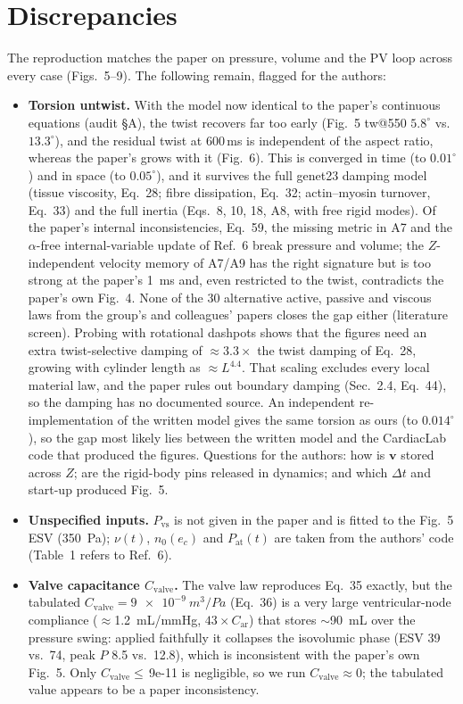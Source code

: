 \documentclass[10pt]{article}
\begin{document}
\section*{Discrepancies}
The reproduction matches the paper on pressure, volume and the PV loop across every case
(Figs.~5--9). The following remain, flagged for the authors:
\begin{itemize}
  \item \textbf{Torsion untwist.} With the model now identical to the paper's continuous
  equations (audit \S A), the twist recovers far too early (Fig.~5 tw@550 $5.8^\circ$ vs.\
  $13.3^\circ$), and the residual twist at 600\,ms is independent of the aspect ratio, whereas
  the paper's grows with it (Fig.~6). This is converged in time (to $0.01^\circ$) and in space
  (to $0.05^\circ$), and it survives the full genet23 damping model (tissue viscosity, Eq.~28;
  fibre dissipation, Eq.~32; actin--myosin turnover, Eq.~33) and the full inertia (Eqs.~8, 10,
  18, A8, with free rigid modes). Of the paper's internal inconsistencies, Eq.~59, the missing
  metric in A7 and the $\alpha$-free internal-variable update of Ref.~6 break pressure and volume; the $Z$-independent velocity memory of A7/A9 has the
  right signature but is too strong at the paper's \SI{1}{ms} and, even restricted to the twist,
  contradicts the paper's own Fig.~4. None of the 30 alternative active, passive and viscous laws from the group's and
  colleagues' papers closes the gap either (literature screen). Probing with rotational dashpots
  shows that the figures need an extra twist-selective damping of $\approx3.3\times$ the twist
  damping of Eq.~28, growing with cylinder length as $\approx L^{4.4}$. That scaling excludes every
  local material law, and the paper rules out boundary damping (Sec.~2.4, Eq.~44), so the
  damping has no documented source. An independent re-implementation of the written model gives
  the same torsion as ours (to $0.014^\circ$), so the gap most likely lies between the written
  model and the CardiacLab code that produced the figures. Questions for the authors: how is $\boldsymbol v$
  stored across $Z$; are the rigid-body pins released in dynamics; and which $\Delta t$ and
  start-up produced Fig.~5.
  \item \textbf{Unspecified inputs.} $P_\text{vs}$ is not given in the paper and is fitted to the
  Fig.~5 ESV (\SI{350}{Pa}); $\nu(t)$, $n_0(e_c)$ and $P_\text{at}(t)$ are taken from the authors'
  code (Table~1 refers to Ref.~6).
  \item \textbf{Valve capacitance $C_\text{valve}$.} The valve law reproduces Eq.~35 exactly, but
  the tabulated $C_\text{valve}{=}\SI{9e-9}{m^3/Pa}$ (Eq.~36) is a very large ventricular-node
  compliance ($\approx$\SI{1.2}{mL/mmHg}, $43\times C_\text{ar}$) that stores $\sim$\SI{90}{mL} over
  the pressure swing: applied faithfully it collapses the isovolumic phase (ESV 39 vs.\ 74, peak
  $P$ 8.5 vs.\ 12.8), which is inconsistent with the paper's own Fig.~5. Only
  $C_\text{valve}\le$\,9e-11 is negligible, so we run $C_\text{valve}{\approx}0$; the tabulated
  value appears to be a paper inconsistency.
\end{itemize}
\end{document}
